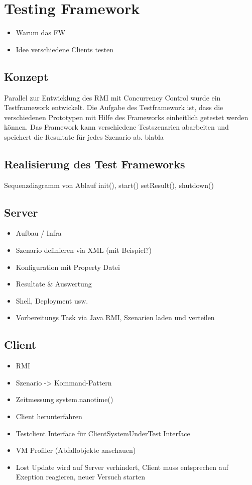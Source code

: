 \section{Testing Framework}
\label{sec:testing Framework}
\begin{itemize}
\item Warum das FW
\item Idee verschiedene Clients testen
\end{itemize}

\subsection{Konzept}
Parallel zur Entwicklung des RMI mit Concurrency Control wurde ein Testframework entwickelt. Die Aufgabe des Testframework ist, dass die verschiedenen Prototypen mit Hilfe des Frameworks einheitlich getestet werden können. Das Framework kann verschiedene Testszenarien abarbeiten und speichert die Resultate für jedes Szenario ab. blabla


\subsection{Realisierung des Test Frameworks}
\label{sec:real test-FW}
Sequenzdiagramm von Ablauf init(), start() setResult(), shutdown()

\subsection{Server}
\label{sec:test-FW Server}
\begin{itemize}
\item Aufbau / Infra
\item Szenario definieren via XML (mit Beispiel?)
\item Konfiguration mit Property Datei
\item Resultate \& Auswertung
\item Shell, Deployment usw.
\item Vorbereitungs Task via Java RMI, Szenarien laden und verteilen
\end{itemize}

\subsection{Client}
\label{sec:test-FW Client}
\begin{itemize}
\item RMI
\item Szenario -> Kommand-Pattern
\item Zeitmessung system.nanotime()
\item Client herunterfahren
\item Testclient Interface für ClientSystemUnderTest Interface
\item VM Profiler (Abfallobjekte anschauen)
\item Lost Update wird auf Server verhindert, Client muss entsprechen auf Exeption reagieren, neuer Versuch starten
\end{itemize}